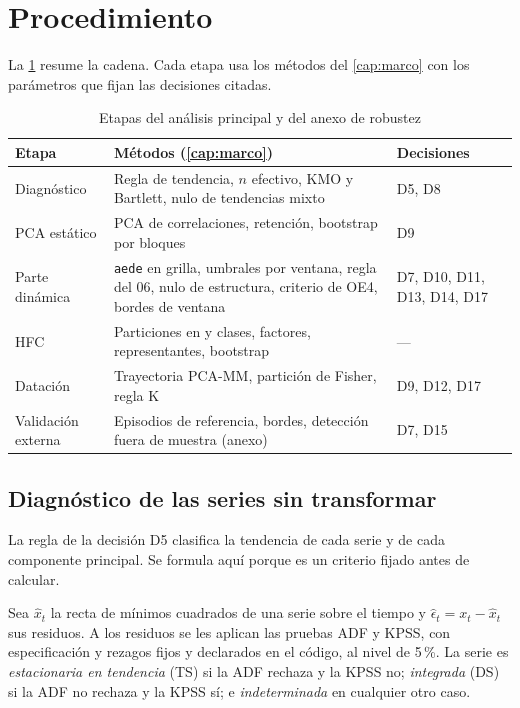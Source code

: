 \section{Procedimiento}
\label{sec:met-procedimiento}

La \cref{tab:etapas} resume la cadena. Cada etapa usa los métodos del \cref{cap:marco} con los
parámetros que fijan las decisiones citadas.

\begin{table}[htbp]
\centering
\small
\caption{Etapas del análisis principal y del anexo de robustez}
\label{tab:etapas}
\begin{tabular}{@{}p{}p{}p{}@{}}
\toprule
Etapa & Métodos (\cref{cap:marco}) & Decisiones \\
\midrule
Diagnóstico & Regla de tendencia, $n$ efectivo, KMO y Bartlett, nulo de tendencias mixto &
  D5, D8 \\
PCA estático & PCA de correlaciones, retención, bootstrap por bloques & D9 \\
Parte dinámica & \texttt{aede} en grilla, umbrales por ventana, regla del 06, nulo de estructura,
  criterio de OE4, bordes de ventana & D7, D10, D11, D13, D14, D17 \\
HFC & Particiones en \clasesHfcMenor{} y \clasesHfcMayor{} clases, factores, representantes, bootstrap & --- \\
Datación & Trayectoria PCA-MM\ventanaMediaMovil{}, partición de Fisher, regla K & D9, D12, D17 \\
Validación externa & Episodios de referencia, bordes, detección fuera de muestra (anexo) & D7,
  D15 \\
\bottomrule
\end{tabular}
\end{table}

\subsection{Diagnóstico de las series sin transformar}
\label{sec:met-diagnostico}

La regla de la decisión D5 clasifica la tendencia de cada serie y de cada componente principal. Se
formula aquí porque es un criterio fijado antes de calcular.

\begin{definicion}\label{def:regla-d5}
Sea $\hat x_t$ la recta de mínimos cuadrados de una serie sobre el tiempo y
$\hat\epsilon_t=x_t-\hat x_t$ sus residuos. A los residuos se les aplican las pruebas ADF y KPSS,
con especificación y rezagos fijos y declarados en el código, al nivel de 5\,\%. La serie es
\emph{estacionaria en tendencia} (TS) si la ADF rechaza y la KPSS no; \emph{integrada} (DS) si la
ADF no rechaza y la KPSS sí; e \emph{indeterminada} en cualquier otro caso.
\end{definicion}

